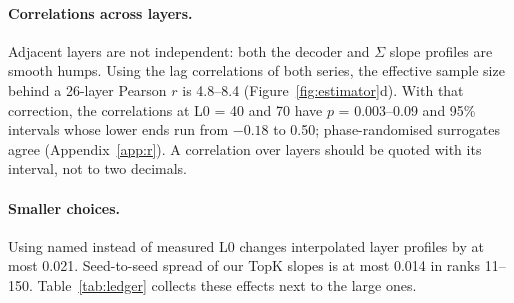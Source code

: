 \documentclass[10pt,twocolumn]{article}
\begin{document}
\paragraph{Correlations across layers.} Adjacent layers are not independent: both the decoder and $\Sigma$ slope profiles are smooth humps. Using the lag correlations of both series, the effective sample size behind a 26-layer Pearson $r$ is 4.8--8.4 (Figure~\ref{fig:estimator}d). With that correction, the correlations at L0 = 40 and 70 have $p$ = 0.003--0.09 and 95\% intervals whose lower ends run from $-0.18$ to 0.50; phase-randomised surrogates agree (Appendix~\ref{app:r}). A correlation over layers should be quoted with its interval, not to two decimals.

\paragraph{Smaller choices.} Using named instead of measured L0 changes interpolated layer profiles by at most 0.021. Seed-to-seed spread of our TopK slopes is at most 0.014 in ranks 11--150. Table~\ref{tab:ledger} collects these effects next to the large ones.
\end{document}
